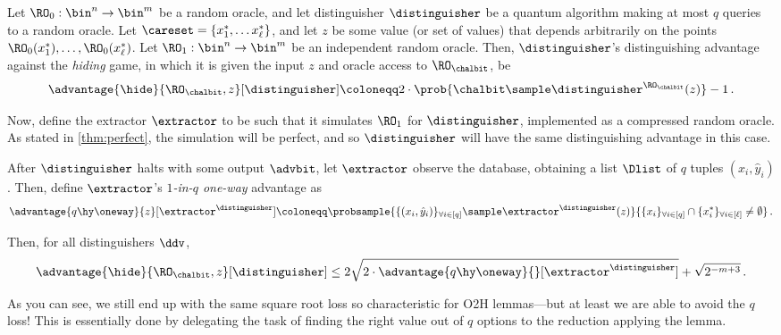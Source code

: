     \begin{theorem}\label{lemma:handsoff-o2h}
      Let $\RO_0: \bin^n \to \bin^m$ be a random oracle, and let distinguisher
        $\distinguisher$ be a quantum algorithm making at most $q$ queries to a
        random oracle. Let $\careset = \{ x^*_1, \ldots x^*_\ell \}$,
        and let $z$ be some value (or set of values) that depends arbitrarily
        on the points $\RO_0(x^*_1), \ldots, \RO_0(x^*_\ell)$. Let $\RO_1:
        \bin^n \to \bin^m$ be an independent random
        oracle. Then, $\distinguisher$'s distinguishing advantage against the
        \emph{hiding} game, in which it is given the input $z$ and oracle access
        to $\RO_\chalbit$, be 
      \[
        \advantage{\hide}{\RO_\chalbit, z}[\distinguisher] 
          \coloneqq 2 \cdot \prob{\chalbit \sample
          \distinguisher^{\RO_\chalbit}(z)} - 1\, .
      \]

      \noindent
      Now, define the extractor $\extractor$ to be such that it simulates $\RO_1$ for 
        $\distinguisher$, implemented as a compressed random oracle.
        As stated in \autoref{thm:perfect}, the simulation will be perfect, and so
        $\distinguisher$ will have the same distinguishing advantage in this case.

      After $\distinguisher$ halts with some output $\advbit$, let $\extractor$ 
        observe the database, obtaining a list $\Dlist$ of $q$ tuples $(x_i,
        \hat{y}_i)$. Then, define $\extractor$'s \emph{$1$-in-$q$ one-way}
        advantage as
      \[
        \advantage{q\hy\oneway}{z}[\extractor^\distinguisher] 
          \coloneqq \probsample{
            \{(x_i,\hat{y}_i)\}_{\forall i \in [q]} \sample
            \extractor^\distinguisher(z)
          }{
            \{x_i\}_{\forall i \in [q]} \cap \{x^*_i\}_{\forall i \in [\ell]} \neq \emptyset
          }\, .
      \]
      
      \noindent
      Then, for all distinguishers $\ddv$,
      \[
        \advantage{\hide}{\RO_\chalbit, z}[\distinguisher]
        \leq 2\sqrt{2 \cdot \advantage{q\hy\oneway}{}[\extractor^\distinguisher]}
        + \sqrt{2^{-m+3}}\, .
      \]
    \end{theorem}

    \noindent
    As you can see, we still end up with the same square root loss 
      so characteristic for O2H lemmas---but at least we are able to avoid the
      $q$ loss! This is essentially done by delegating the task of
      finding the right value out of $q$ options to the reduction
      applying the lemma.

